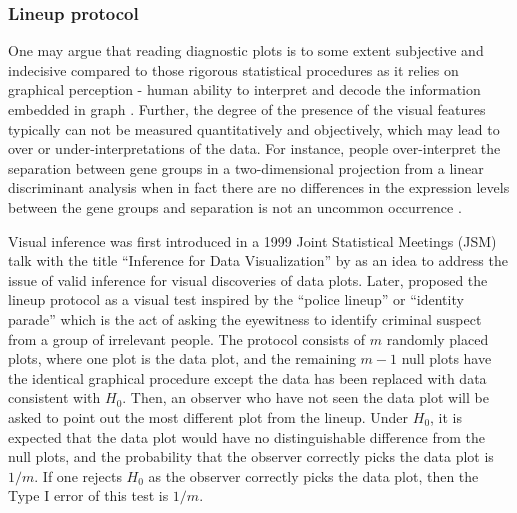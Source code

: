 \documentclass[]{interact}
\theoremstyle{plain}%
\theoremstyle{definition}
\theoremstyle{remark}
\begin{document}
\hypertarget{lineup-protocol}{%
\subsubsection{Lineup protocol}\label{lineup-protocol}}

One may argue that reading diagnostic plots is to some extent subjective
and indecisive compared to those rigorous statistical procedures as it
relies on graphical perception - human ability to interpret and decode
the information embedded in graph \citep{cleveland_graphical_1984}.
Further, the degree of the presence of the visual features typically can
not be measured quantitatively and objectively, which may lead to over
or under-interpretations of the data. For instance, people
over-interpret the separation between gene groups in a two-dimensional
projection from a linear discriminant analysis when in fact there are no
differences in the expression levels between the gene groups and
separation is not an uncommon occurrence
\citep{roy_chowdhury_using_2015}.

Visual inference was first introduced in a 1999 Joint Statistical
Meetings (JSM) talk with the title ``Inference for Data Visualization''
by \citet{buja_inference_1999} as an idea to address the issue of valid
inference for visual discoveries of data plots. Later,
\citet{buja_statistical_2009} proposed the lineup protocol as a visual
test inspired by the ``police lineup'' or ``identity parade'' which is
the act of asking the eyewitness to identify criminal suspect from a
group of irrelevant people. The protocol consists of \(m\) randomly
placed plots, where one plot is the data plot, and the remaining
\(m - 1\) null plots have the identical graphical procedure except the
data has been replaced with data consistent with \(H_0\). Then, an
observer who have not seen the data plot will be asked to point out the
most different plot from the lineup. Under \(H_0\), it is expected that
the data plot would have no distinguishable difference from the null
plots, and the probability that the observer correctly picks the data
plot is \(1/m\). If one rejects \(H_0\) as the observer correctly picks
the data plot, then the Type I error of this test is \(1/m\).
\end{document}
